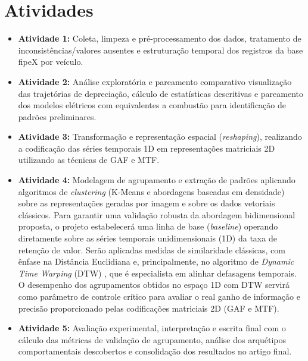 \section{Atividades}

\begin{itemize}
      \item \textbf{Atividade 1:} Coleta, limpeza e pré-processamento dos dados, tratamento de inconsistências/valores ausentes e estruturação temporal dos registros da base fipeX por veículo.
      
      \item \textbf{Atividade 2:} Análise exploratória e pareamento comparativo visualização das trajetórias de depreciação, cálculo de estatísticas descritivas e pareamento dos modelos elétricos com equivalentes a combustão para identificação de padrões preliminares.
      
      \item \textbf{Atividade 3:} Transformação e representação espacial (\textit{reshaping}), realizando a codificação das séries temporais 1D em representações matriciais 2D utilizando as técnicas de GAF e MTF.
      
      \item \textbf{Atividade 4:} Modelagem de agrupamento e extração de padrões aplicando algoritmos de \textit{clustering} (K-Means e abordagens baseadas em densidade) sobre as representações geradas por imagem e sobre os dados vetoriais clássicos. Para garantir uma validação robusta da abordagem bidimensional proposta, o projeto estabelecerá uma linha de base (\textit{baseline}) operando diretamente sobre as séries temporais unidimensionais (1D) da taxa de retenção de valor. Serão aplicadas medidas de similaridade clássicas, com ênfase na Distância Euclidiana e, principalmente, no algoritmo de \textit{Dynamic Time Warping} (DTW) \cite{sakoe1978dynamic}, que é especialista em alinhar defasagens temporais. O desempenho dos agrupamentos obtidos no espaço 1D com DTW servirá como parâmetro de controle crítico para avaliar o real ganho de informação e precisão proporcionado pelas codificações matriciais 2D (GAF e MTF).

      \item \textbf{Atividade 5:} Avaliação experimental, interpretação e escrita final com o cálculo das métricas de validação de agrupamento, análise dos arquétipos comportamentais descobertos e consolidação dos resultados no artigo final.
\end{itemize}
